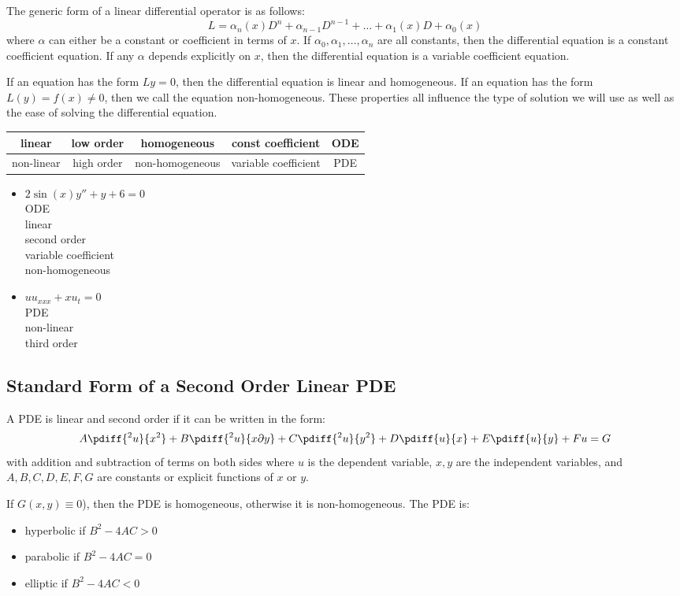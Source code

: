 \documentclass{math}
\begin{document}
The generic form of a linear differential operator is as follows:
\[ L = \alpha_n(x)D^n+\alpha_{n-1}D^{n-1}+\dots+\alpha_1(x)D+\alpha_0(x) \]
where \( \alpha \) can either be a constant or coefficient in terms of \( x \).
If \( \alpha_0,\alpha_1,\dots,\alpha_n \) are all constants, then the
differential equation is a constant coefficient equation. If any \( \alpha \)
depends explicitly on \( x \), then the differential equation is a variable
coefficient equation. \par
If an equation has the form \( Ly = 0 \), then the differential equation is
linear and homogeneous. If an equation has the form \( L(y) = f(x) \ne 0 \),
then we call the equation non-homogeneous. These properties all influence the
type of solution we will use as well as the ease of solving the differential
equation.
\begin{center}
  \begin{tabular}{|c|c|c|c|c|}
    \hline
    linear & low order & homogeneous & const coefficient & ODE \\
    \hline
    non-linear & high order & non-homogeneous & variable coefficient & PDE \\
    \hline
  \end{tabular}
\end{center}
\begin{itemize}
  \item \( 2\sin(x)y''+y+6 = 0 \) \\
    ODE \\
    linear \\
    second order \\
    variable coefficient \\
    non-homogeneous
  \item \( uu_{xxx}+xu_t = 0 \) \\
    PDE \\
    non-linear \\
    third order
\end{itemize}

\subsection*{Standard Form of a Second Order Linear PDE}
A PDE is linear and second order if it can be written in the form:
\[ A\pdiff{^2u}{x^2}+B\pdiff{^2u}{x\partial y}+C\pdiff{^2u}{y^2}+
  D\pdiff{u}{x}+E\pdiff{u}{y}+Fu = G \]
with addition and subtraction of terms on both sides where \( u \) is the
dependent variable, \( x,y \) are the independent variables, and
\( A,B,C,D,E,F,G \) are constants or explicit functions of \( x \) or \( y \).
\par
If \( G(x,y) \equiv 0 \)), then the PDE is homogeneous, otherwise it is
non-homogeneous. The PDE is:
\begin{itemize}
  \item hyperbolic if \( B^2-4AC > 0 \)
  \item parabolic if \( B^2-4AC = 0 \)
  \item elliptic if \( B^2-4AC < 0 \)
\end{itemize}
\end{document}
